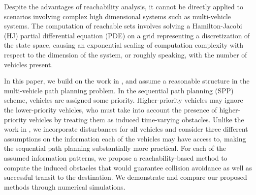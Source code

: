 Despite the advantages of reachability analysis, it cannot be directly applied to scenarios involving complex high dimensional systems such as multi-vehicle systems. The computation of reachable sets involves solving a Hamilton-Jacobi (HJ) partial differential equation (PDE) on a grid representing a discretization of the state space, causing an exponential scaling of computation complexity with respect to the dimension of the system, or roughly speaking, with the number of vehicles present.

In this paper, we build on the work in \cite{Chen15}, and assume a reasonable structure in the multi-vehicle path planning problem. In the sequential path planning (SPP) scheme, vehicles are assigned some priority. Higher-priority vehicles may ignore the lower-priority vehicles, who must take into account the presence of higher-priority vehicles by treating them as induced time-varying obstacles. Unlike the work in \cite{Chen15}, we incorporate disturbances for all vehicles and consider three different assumptions on the information each of the vehicles may have access to, making the sequential path planning substantially more practical. For each of the assumed information patterns, we propose a reachability-based method to compute the induced obstacles that would guarantee collision avoidance as well as successful transit to the destination. We demonstrate and compare our proposed methods through numerical simulations.